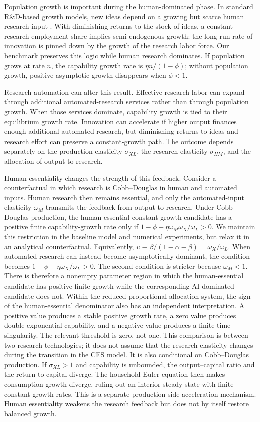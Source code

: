 Population growth is important during the human-dominated phase. In standard R\&D-based growth
models, new ideas depend on a growing but scarce human research input
\citep{romer1990,jones1995,aghionhowitt1992}. With diminishing returns to the stock of
ideas, a constant research-employment share implies semi-endogenous growth: the
long-run rate of innovation is pinned down by the growth of the research labor force.
Our benchmark preserves this logic while human research dominates. If population grows at rate
$n$, the capability growth rate is $\eta n/(1-\phi)$; without population growth,
positive asymptotic growth disappears when $\phi<1$.

Research automation can alter this result. Effective research labor can expand
through additional automated-research services rather than through population growth.
When those services dominate, capability growth is tied to their equilibrium growth
rate. Innovation can accelerate if higher output finances enough additional
automated research, but diminishing returns to ideas and research effort can preserve
a constant-growth path. The outcome depends separately on the production elasticity
$\sigma_{XL}$, the research elasticity $\sigma_{HM}$, and the allocation of output to research.

Human essentiality changes the strength of this feedback. Consider a counterfactual
in which research is Cobb--Douglas in human and automated inputs. Human research then
remains essential, and only the automated-input elasticity $\omega_M$ transmits the
feedback from output to research. Under Cobb--Douglas production, the human-essential
constant-growth candidate has a positive finite capability-growth rate only if
$1-\phi-\eta\omega_M\omega_X/\omega_L>0$. We maintain this restriction in the
baseline model and numerical experiments, but relax it in an analytical
counterfactual. Equivalently,
$\upsilon\equiv\beta/(1-\alpha-\beta)=\omega_X/\omega_L$. When automated research can instead become
asymptotically dominant, the condition becomes
$1-\phi-\eta\omega_X/\omega_L>0$. The second condition is stricter because $\omega_M<1$. There is
therefore a nonempty parameter region in which the human-essential candidate has
positive finite growth while the corresponding AI-dominated candidate does not.
Within the reduced proportional-allocation system, the sign of the human-essential
denominator also has an independent interpretation. A positive value produces a
stable positive growth rate, a zero value produces double-exponential capability,
and a negative value produces a finite-time singularity. The relevant threshold is
zero, not one.
This comparison is between two research technologies; it does not assume that the
research elasticity changes during the transition in the CES model. It is also
conditional on Cobb--Douglas production. If $\sigma_{XL}>1$ and capability is
unbounded, the output--capital ratio and the return to capital diverge. The household
Euler equation then makes consumption growth diverge, ruling out an interior steady
state with finite constant growth rates. This is a separate production-side
acceleration mechanism. Human essentiality weakens the research feedback but does
not by itself restore balanced growth.

